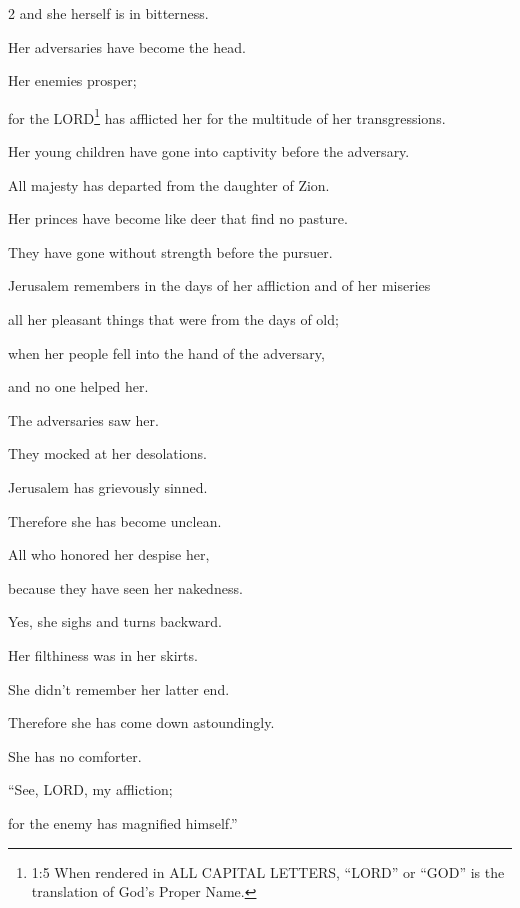 \begin{multicols}{2}
	and she herself is in bitterness.
	\vspace{\baselineskip}
	
	\myverse{}Her adversaries have become the head.
	
	Her enemies prosper;
	
	for the LORD\footnote{1:5 When rendered in ALL CAPITAL LETTERS, “LORD” or “GOD” is the translation of God’s Proper Name.}
	has afflicted her for the multitude of her transgressions.
	
	Her young children have gone into captivity before the adversary.
	\vspace{\baselineskip}
	
	\myverse{}All majesty has departed from the daughter of Zion.
	
	Her princes have become like deer that find no pasture.
	
	They have gone without strength before the pursuer.
	\vspace{\baselineskip}
	
	\myverse{}Jerusalem remembers in the days of her affliction and of her miseries
	
	all her pleasant things that were from the days of old;
	
	when her people fell into the hand of the adversary,
	
	and no one helped her.
	
	The adversaries saw her.
	
	They mocked at her desolations.
	\vspace{\baselineskip}
	
	\myverse{}Jerusalem has grievously sinned.
	
	Therefore she has become unclean.
	
	All who honored her despise her,
	
	because they have seen her nakedness.
	
	Yes, she sighs and turns backward.
	\vspace{\baselineskip}
	
	\myverse{}Her filthiness was in her skirts.
	
	She didn’t remember her latter end.
	
	Therefore she has come down astoundingly.
	
	She has no comforter.
	
	“See, LORD, my affliction;
	
	for the enemy has magnified himself.”
	\vspace{\baselineskip}
	

\end{multicols}
